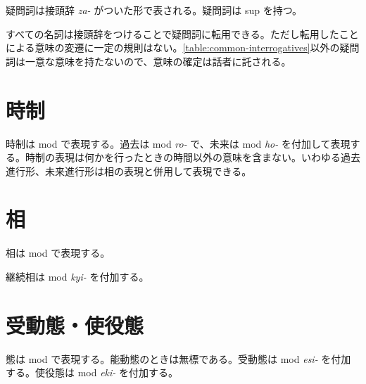 疑問詞は接頭辞 \emph{za-} がついた形で表される。疑問詞は sup を持つ。

すべての名詞は接頭辞をつけることで疑問詞に転用できる。ただし転用したことによる意味の変遷に一定の規則はない。\cref{table:common-interrogatives}以外の疑問詞は一意な意味を持たないので、意味の確定は話者に託される。

\section{時制}

時制は mod で表現する。過去は mod \emph{ro-} で、未来は mod \emph{ho-} を付加して表現する。時制の表現は何かを行ったときの時間以外の意味を含まない。いわゆる過去進行形、未来進行形は相の表現と併用して表現できる。

\section{相}

相は mod で表現する。

継続相は mod \emph{kyi-} を付加する。

\section{受動態・使役態}

態は mod で表現する。能動態のときは無標である。受動態は mod \emph{esi-} を付加する。使役態は mod \emph{eki-} を付加する。